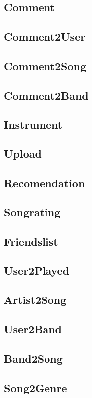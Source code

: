 \documentclass[11pt,a4paper,DIV=9]{scrartcl}
\begin{document}
  \subsection{Comment}
  \subsection{Comment2User}
  \subsection{Comment2Song}
  \subsection{Comment2Band}
  \subsection{Instrument}
  \subsection{Upload}
  \subsection{Recomendation}
  \subsection{Songrating}
  \subsection{Friendslist}
  \subsection{User2Played}
  \subsection{Artist2Song}
  \subsection{User2Band}
  \subsection{Band2Song}
  \subsection{Song2Genre}
\end{document}

